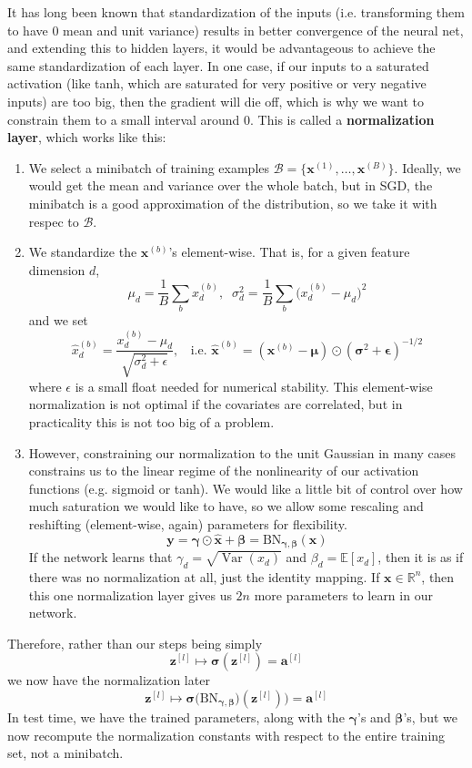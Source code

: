 \documentclass{article}
\DeclareMathOperator{\Var}{Var}
\theoremstyle{definition}
\theoremstyle{remark}
\theoremstyle{definition}
\begin{document}
It has long been known that standardization of the inputs (i.e. transforming them to have $0$ mean and unit variance) results in better convergence of the neural net, and extending this to hidden layers, it would be advantageous to achieve the same standardization of each layer. In one case, if our inputs to a saturated activation (like tanh, which are saturated for very positive or very negative inputs) are too big, then the gradient will die off, which is why we want to constrain them to a small interval around $0$. This is called a \textbf{normalization layer}, which works like this: 
\begin{enumerate}
    \item We select a minibatch of training examples $\mathcal{B} = \{\mathbf{x}^{(1)}, \ldots, \mathbf{x}^{(B)}\}$. Ideally, we would get the mean and variance over the whole batch, but in SGD, the minibatch is a good approximation of the distribution, so we take it with respec to $\mathcal{B}$. 
    
    \item We standardize the $\mathbf{x}^{(b)}$'s element-wise. That is, for a given feature dimension $d$, 
    \[\mu_d = \frac{1}{B} \sum_b x^{(b)}_d, \;\; \sigma^2_d = \frac{1}{B} \sum_{b} \big(x^{(b)}_d - \mu_d \big)^2\]
    and we set 
    \[\hat{x}_d^{(b)} = \frac{x_d^{(b)} - \mu_d}{\sqrt{\sigma^2_d + \epsilon}}, \;\; \text{ i.e. } \hat{\mathbf{x}}^{(b)} = (\mathbf{x}^{(b)} - \boldsymbol{\mu}) \odot (\boldsymbol{\sigma}^2 + \boldsymbol{\epsilon})^{-1/2}\]
    where $\epsilon$ is a small float needed for numerical stability. 
    This element-wise normalization is not optimal if the covariates are correlated, but in practicality this is not too big of a problem. 

    \item However, constraining our normalization to the unit Gaussian in many cases constrains us to the linear regime of the nonlinearity of our activation functions (e.g. sigmoid or tanh). We would like a little bit of control over how much saturation we would like to have, so we allow some rescaling and reshifting (element-wise, again) parameters for flexibility. 
    \[\mathbf{y} = \boldsymbol{\gamma} \odot \hat{\mathbf{x}} + \boldsymbol{\beta} = \mathrm{BN}_{\boldsymbol{\gamma}, \boldsymbol{\beta}} (\mathbf{x})\]
    If the network learns that $\gamma_d = \sqrt{\Var(x_d)}$ and $\beta_d = \mathbb{E}[x_d]$, then it is as if there was no normalization at all, just the identity mapping. If $\mathbf{x} \in \mathbb{R}^n$, then this one normalization layer gives us $2n$ more parameters to learn in our network. 
\end{enumerate}
Therefore, rather than our steps being simply 
\[\mathbf{z}^{[l]} \mapsto \boldsymbol{\sigma}(\mathbf{z}^{[l]}) = \mathbf{a}^{[l]}\]
we now have the normalization later 
\[\mathbf{z}^{[l]} \mapsto \boldsymbol{\sigma}\big( \mathrm{BN}_{\boldsymbol{\gamma}, \boldsymbol{\beta}})(\mathbf{z}^{[l]}) \big) = \mathbf{a}^{[l]}\]
In test time, we have the trained parameters, along with the $\boldsymbol{\gamma}$'s and $\boldsymbol{\beta}$'s, but we now recompute the normalization constants with respect to the entire training set, not a minibatch. 
\end{document}
